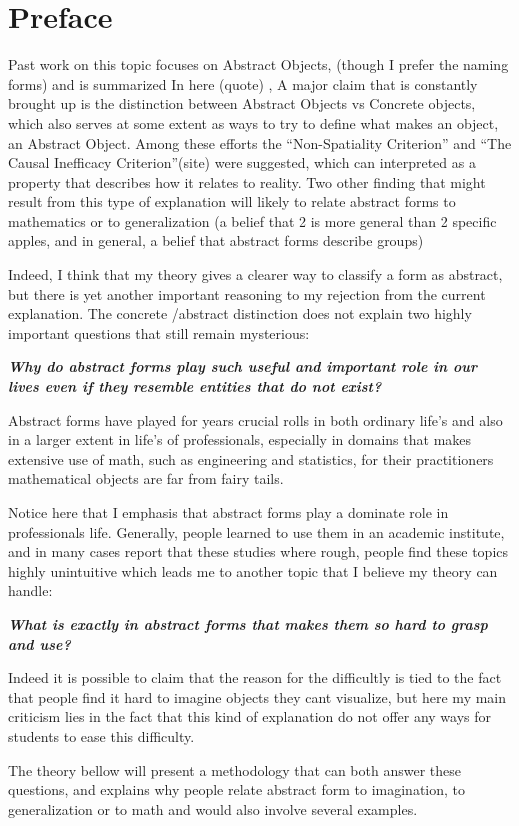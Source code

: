 \documentclass[10pt]{article}
\begin{document}
\newpage


\section*{Preface}
Past work on this topic focuses on Abstract Objects,  (though I prefer the naming forms) and is summarized In here (quote) , A major claim that is constantly  brought up is the distinction between Abstract Objects vs Concrete objects, which also serves at some extent as ways to try to define what makes an object, an Abstract Object. Among these efforts the “Non-Spatiality Criterion” and “The Causal Inefficacy Criterion”(site)  were suggested, which can interpreted as a property that describes how it relates to reality. Two other finding that might result from this type of explanation will likely to relate abstract forms to mathematics or to generalization (a belief that 2 is more general than 2 specific apples, and in general, a belief that abstract forms describe groups)\par

Indeed, I think that my theory gives a clearer way to classify a form as abstract,  but there is yet another important reasoning to my rejection from the current explanation. The concrete /abstract distinction does not explain two highly important questions that still remain mysterious: \par
\textbf{\textit{Why do abstract forms play such useful and important role in our lives even if they resemble entities that do not exist?}}\par
Abstract forms have played for years crucial rolls in both ordinary life's and also in a larger extent in life's of professionals, especially in domains that makes extensive use of math, such as engineering and statistics, for their practitioners mathematical objects are far from fairy tails.
\par
Notice here that I emphasis that  abstract forms play a dominate role in professionals life. Generally, people learned to use them in an academic institute, and in many cases report that these studies where rough, people find these topics highly unintuitive which leads me to another topic that I believe my theory can handle:\par

\textbf{\textit{What is exactly in abstract forms that makes them so hard to grasp and use?}}
\par
Indeed it is possible to claim that the reason for the difficultly is tied to the fact that people find it hard to imagine objects they cant visualize, but here my main criticism lies in the fact that this kind of explanation do not offer any ways for students to ease this difficulty.\par
The theory bellow will present a methodology that can both answer these questions, and explains why people relate abstract form to imagination, to generalization or to math and would also involve several examples.
\newpage 
\end{document}

